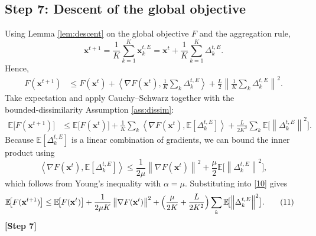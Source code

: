 \documentclass{article}
\newcommand{\E}{\mathbb{E}}
\newcommand{\norm}[1]{\left\lVert #1 \right\rVert}
\newcommand{\inner}[2]{\left\langle #1,#2 \right\rangle}
\begin{document}
\subsection*{Step 7: Descent of the global objective}
Using Lemma \ref{lem:descent} on the global objective $F$ and the aggregation rule,
\[
\mathbf{x}^{t+1}
=
\frac{1}{K}\sum_{k=1}^{K}\mathbf{x}_{k}^{t,E}
=
\mathbf{x}^{t}
+\frac{1}{K}\sum_{k=1}^{K}\Delta_{k}^{t,E}.
\]
Hence,
\begin{align}
F(\mathbf{x}^{t+1})
&\le
F(\mathbf{x}^{t})
+\inner{\nabla F(\mathbf{x}^{t})}{\frac{1}{K}\sum_{k}\Delta_{k}^{t,E}}
+\frac{L}{2}\norm{\frac{1}{K}\sum_{k}\Delta_{k}^{t,E}}^{2}.
\tag{9}
\end{align}
Take expectation and apply Cauchy–Schwarz together with the bounded‑dissimilarity Assumption \ref{ass:dissim}:
\begin{align}
\E\!\bigl[F(\mathbf{x}^{t+1})\bigr]
&\le
\E\!\bigl[F(\mathbf{x}^{t})\bigr]
+\frac{1}{K}\sum_{k}\inner{\nabla F(\mathbf{x}^{t})}{\E[\Delta_{k}^{t,E}]}
+\frac{L}{2K^{2}}
\sum_{k}\E\!\bigl[\norm{\Delta_{k}^{t,E}}^{2}\bigr].
\tag{10}
\end{align}
Because $\E[\Delta_{k}^{t,E}]$ is a linear combination of gradients, we can bound the inner product using
\[
\inner{\nabla F(\mathbf{x}^{t})}{\E[\Delta_{k}^{t,E}]}
\le
\frac{1}{2\mu}\norm{\nabla F(\mathbf{x}^{t})}^{2}
+\frac{\mu}{2}\E\!\bigl[\norm{\Delta_{k}^{t,E}}^{2}\bigr],
\]
which follows from Young’s inequality with $\alpha=\mu$.
Substituting into \eqref{10} gives
\begin{align}
\E\!\bigl[F(\mathbf{x}^{t+1})\bigr]
&\le
\E\!\bigl[F(\mathbf{x}^{t})\bigr]
+\frac{1}{2\mu K}\norm{\nabla F(\mathbf{x}^{t})}^{2}
+\Bigl(\frac{\mu}{2K}+\frac{L}{2K^{2}}\Bigr)
\sum_{k}\E\!\bigl[\norm{\Delta_{k}^{t,E}}^{2}\bigr].
\tag{11}
\end{align}
\noindent\textbf{[Step 7]}
\end{document}
